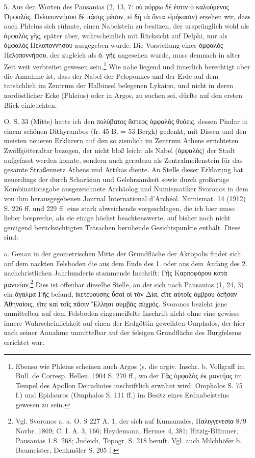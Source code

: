 \documentclass[a4paper, 11pt, oneside]{article}
\begin{document}
5. Aus den Worten des Pausanias (2, 13, 7: οὐ πόρρω δέ ἐστιν ὁ καλούμενος Ὀμφαλός, Πελοποννήσου δὲ πάσης μέσον, εἰ δὴ τὰ ὄντα εἰρήκασιν) ersehen wir, dass auch Phleius sich rühmte, einen Nabelstein zu besitzen, der ursprünglich wohl als ὀμφαλὸς γῆς, später aber, wahrscheinlich mit Rücksicht auf Delphi, nur als ὀμφαλὸς Πελοποννήσου ausgegeben wurde. Die Vorstellung eines ὀμφαλὸς Πελοποννήσου, der zugleich als ὀ. γῆς angesehen wurde, muss demnach in alter Zeit weit verbreitet gewesen sein.\footnote{Ebenso wie Phleius scheinen auch Argos (s. die argiv. Inschr. b. Vollgraff im Bull. de Corresp. Hellen. 1904 S. 270 ff., wo der Γᾶς ὀμφαλὸς ἐκ μαντήας im Tempel des Apollon Deiradiotes inschriftlich erwähnt wird: Omphalos S. 75 f.) und Epidauros (Omphalos S. 111 ff.) im Besitz eines Erdnabelsteins gewesen zu sein.} Wie nahe liegend und innerlich berechtigt aber die Annahme ist, dass der Nabel der Peloponnes und der Erde auf dem tatsächlich im Zentrum der Halbinsel belegenen Lykaion, und nicht in deren nordöstlicher Ecke (Phleius) oder in Argos, zu suchen sei, dürfte auf den ersten Blick einleuchten.

O. S. 33 (Mitte) hatte ich den πολύβατος ἄστεος ὀμφαλὸς θυόεις, dessen Pindar in einem schönen Dithyrambos (fr. 45 B. = 53 Bergk) gedenkt, mit Dissen und den meisten neueren Erklärern auf den so ziemlich im Zentrum Athens errichteten Zwölfgötteraltar bezogen, der nicht bloß leicht als Nabel (ὀμφαλός) der Stadt aufgefasst werden konnte, sondern auch geradezu als Zentralmeilenstein für das gesamte Straßennetz Athens und Attikas diente. An Stelle dieser Erklärung hat neuerdings der durch Scharfsinn und Gelehrsamkeit sowie durch großartige Kombinationsgabe ausgezeichnete Archäolog und Numismatiker Svoronos in dem von ihm herausgegebenen Journal International d'Archéol. Numismat. 14 (1912) S. 226 ff. und 229 ff. eine stark abweichende vorgeschlagen, die ich hier umso lieber bespreche, als sie einige höchst beachtenswerte, auf bisher noch nicht genügend berücksichtigten Tatsachen beruhende Gesichtspunkte enthält. Diese sind:

a. Genau in der geometrischen Mitte der Grundfläche der Akropolis findet sich auf dem nackten Felsboden die aus dem Ende des 1. oder aus dem Anfang des 2. nachchristlichen Jahrhunderts stammende Inschrift: Γῆς Καρποφόρου κατὰ μαντείαν.\footnote{Vgl. Svoronos a. a. O. S 227 A. 1, der sich auf Kumanudes, Παλιγγενεσία 8/9 Novbr. 1869; C. I. A. 3, 166; Heydemann, Hermes 4, 381; Hitzig-Blümner, Pausanias 1 S. 268; Judeich, Topogr. S. 218 beruft. Vgl. auch Milchhöfer b. Baumeister, Denkmäler S. 205 f.} Dies ist offenbar dieselbe Stelle, an der sich nach Pausanias (1, 24, 3) ein ἄγαλμα Γῆς befand, ἱκετευούσης ὗσαί οἱ τὸν Δία, εἴτε αὐτοῖς ὄμβρου δεῆσαν Ἀθηναίοις, εἴτε καὶ τοῖς πᾶσιν Ἕλλησι συμβὰς αὐχμός. Svoronos bezieht jene unmittelbar auf dem Felsboden eingemeißelte Inschrift nicht ohne eine gewisse innere Wahrscheinlichkeit auf einen der Erdgöttin geweihten Omphalos, der hier nach seiner Annahme unmittelbar auf der felsigen Grundfläche des Burgfelsens errichtet war.
\end{document}
